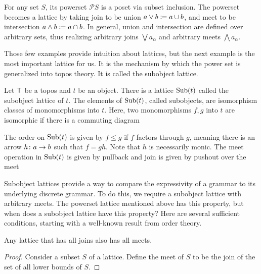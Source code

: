 \documentclass{amsart}
\begin{document}
\begin{example}
  For any set $ S $, its powerset $ \mathcal{P}S $ is a
  poset via subset inclusion. The powerset becomes a lattice
  by taking join to be union $ a \vee b \coloneqq a \cup b $,
  and meet to be intersection $ a \wedge b \coloneqq a \cap b
  $. In general, union and intersection are defined over
  arbitrary sets, thus realizing arbitrary joins
  $ \bigvee a_\alpha $ and arbitrary meets
  $ \bigwedge a_\alpha $. 
\end{example}

Those few examples provide intuition about lattices, but the
next example is the most important lattice for us. It is the
mechanism by which the power set is generalized into topos
theory. It is called the subobject lattice.

\begin{example}
  Let $ \mathsf{T} $ be a topos and $ t $ be an object. There is a
  lattice $ \operatorname{Sub} (t) $ called the subobject lattice of
  $ t $.  The elements of $ \operatorname{Sub} (t) $, called
  subobjects, are isomorphism classes of monomorphisms
  into $ t $. Here, two monomorphisms $ f,g $ into $ t $ are
  isomorphic if there is a commuting diagram 
  
  The order on $ \operatorname{Sub} (t) $ is given by $ f \leq g $ if
  $ f $ factors through $ g $, meaning there is an arrow
  $ h \colon a \to b $ such that $ f = gh $. Note that $ h $
  is necessarily monic. The meet operation in $ \operatorname{Sub} (t) $
  is given by pullback  and
  join is given by pushout over the meet
  
\end{example}

Subobject lattices provide a way to compare the expressivity of a grammar to its underlying discrete grammar.
To do
this, we require a subobject lattice with arbitrary meets.  The
powerset lattice mentioned above has this property, but
when does a subobject lattice have this property?  Here are
several sufficient conditions, starting with a well-known
result from order theory.

\begin{proposition} \label{thm:lattice-alljoins-allmeets}
  Any lattice that has all joins also has all meets.
\end{proposition}

\begin{proof}
  Consider a subset $ S $ of a lattice. Define the meet of $
  S $ to be the join of the set of all lower bounds of $ S $.
\end{proof}
\end{document}
